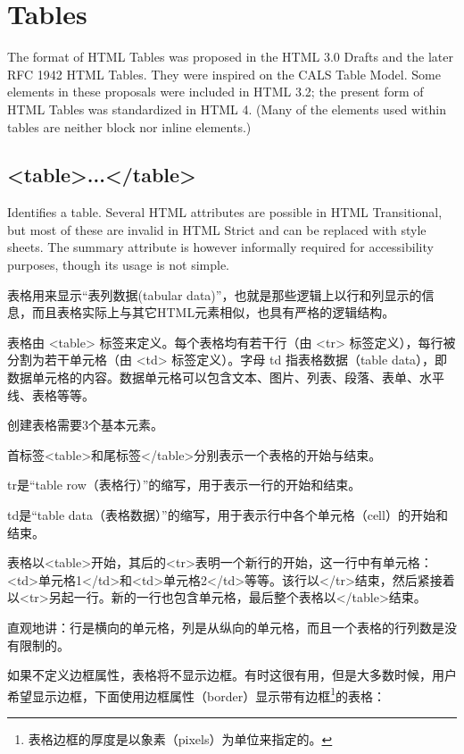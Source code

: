 \section{Tables}


The format of HTML Tables was proposed in the HTML 3.0 Drafts and the later RFC 1942 HTML Tables. They were inspired on the CALS Table Model. Some elements in these proposals were included in HTML 3.2; the present form of HTML Tables was standardized in HTML 4. (Many of the elements used within tables are neither block nor inline elements.)

\subsection{<table>...</table>}

Identifies a table. Several HTML attributes are possible in HTML Transitional, but most of these are invalid in HTML Strict and can be replaced with style sheets. The summary attribute is however informally required for accessibility purposes, though its usage is not simple.

表格用来显示“表列数据(tabular data)”，也就是那些逻辑上以行和列显示的信息，而且表格实际上与其它HTML元素相似，也具有严格的逻辑结构。

表格由 <table> 标签来定义。每个表格均有若干行（由 <tr> 标签定义），每行被分割为若干单元格（由 <td> 标签定义）。字母 td 指表格数据（table data），即数据单元格的内容。数据单元格可以包含文本、图片、列表、段落、表单、水平线、表格等等。

\begin{compactitem}
\item 创建表格需要3个基本元素。
\item 首标签<table>和尾标签</table>分别表示一个表格的开始与结束。
\item tr是“table row（表格行）”的缩写，用于表示一行的开始和结束。
\item td是“table data（表格数据）”的缩写，用于表示行中各个单元格（cell）的开始和结束。
\end{compactitem}

表格以<table>开始，其后的<tr>表明一个新行的开始，这一行中有单元格：<td>单元格1</td>和<td>单元格2</td>等等。该行以</tr>结束，然后紧接着以<tr>另起一行。新的一行也包含单元格，最后整个表格以</table>结束。

直观地讲：行是横向的单元格，列是从纵向的单元格，而且一个表格的行列数是没有限制的。

如果不定义边框属性，表格将不显示边框。有时这很有用，但是大多数时候，用户希望显示边框，下面使用边框属性（border）显示带有边框\footnote{表格边框的厚度是以象素（pixels）为单位来指定的。}的表格：

